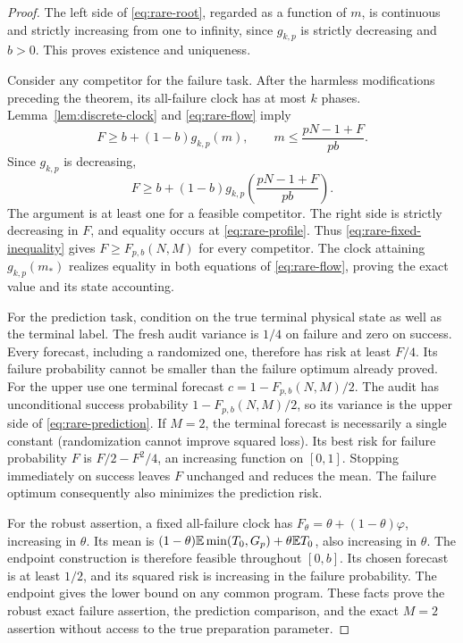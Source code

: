 \begin{proof}
The left side of \eqref{eq:rare-root}, regarded as a function of $m$, is continuous and strictly increasing from one to infinity, since $g_{k,p}$ is strictly decreasing and $b>0$. This proves existence and uniqueness.

Consider any competitor for the failure task. After the harmless modifications preceding the theorem, its all-failure clock has at most $k$ phases. Lemma~\ref{lem:discrete-clock} and \eqref{eq:rare-flow} imply
\[
 F\ge b+(1-b)g_{k,p}(m),\qquad
 m\le\frac{pN-1+F}{pb}.
\]
Since $g_{k,p}$ is decreasing,
\begin{equation}\label{eq:rare-fixed-inequality}
 F\ge b+(1-b)g_{k,p}\!\left(\frac{pN-1+F}{pb}\right).
\end{equation}
The argument is at least one for a feasible competitor. The right side is strictly decreasing in $F$, and equality occurs at \eqref{eq:rare-profile}. Thus \eqref{eq:rare-fixed-inequality} gives $F\ge F_{p,b}(N,M)$ for every competitor. The clock attaining $g_{k,p}(m_*)$ realizes equality in both equations of \eqref{eq:rare-flow}, proving the exact value and its state accounting.

For the prediction task, condition on the true terminal physical state as well as the terminal label. The fresh audit variance is $1/4$ on failure and zero on success. Every forecast, including a randomized one, therefore has risk at least $F/4$. Its failure probability cannot be smaller than the failure optimum already proved. For the upper use one terminal forecast $c=1-F_{p,b}(N,M)/2$. The audit has unconditional success probability $1-F_{p,b}(N,M)/2$, so its variance is the upper side of \eqref{eq:rare-prediction}. If $M=2$, the terminal forecast is necessarily a single constant (randomization cannot improve squared loss). Its best risk for failure probability $F$ is $F/2-F^2/4$, an increasing function on $[0,1]$. Stopping immediately on success leaves $F$ unchanged and reduces the mean. The failure optimum consequently also minimizes the prediction risk.

For the robust assertion, a fixed all-failure clock has $F_\theta=\theta+(1-\theta)\varphi$, increasing in $\theta$. Its mean is
$(1-\theta)\mathbb E\min(T_0,G_p)+\theta\mathbb E T_0$, also increasing in $\theta$. The endpoint construction is therefore feasible throughout $[0,b]$. Its chosen forecast is at least $1/2$, and its squared risk is increasing in the failure probability. The endpoint gives the lower bound on any common program. These facts prove the robust exact failure assertion, the prediction comparison, and the exact $M=2$ assertion without access to the true preparation parameter.
\end{proof}

